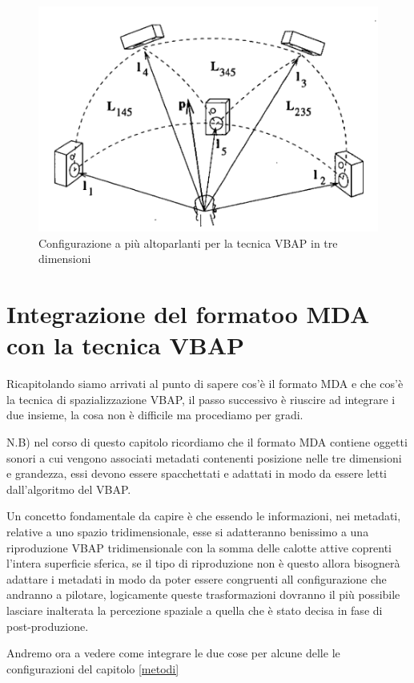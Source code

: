 \documentclass[12pt,a4paper]{report}
\begin{document}
\begin{itemize}
\begin{figure}[htbp]
	\centering
	\includegraphics[scale=0.50 ]{figures/matrix3dfull.png}
	\caption {Configurazione a più altoparlanti per la tecnica VBAP in tre dimensioni}
	\label{fig:matrix3dfull}
	\end{figure}


\section{Integrazione del formatoo MDA con la tecnica VBAP}

Ricapitolando siamo arrivati al punto di sapere cos'è il formato MDA e che cos'è la tecnica di spazializzazione VBAP,
il passo successivo è riuscire ad integrare i due insieme, la cosa non è difficile ma procediamo per gradi.

N.B) nel corso di questo capitolo
ricordiamo che il formato MDA contiene oggetti sonori a cui vengono associati metadati contenenti posizione nelle tre dimensioni e grandezza, essi devono essere spacchettati e adattati in modo da essere letti dall'algoritmo del VBAP.

Un concetto fondamentale da capire è che essendo le informazioni, nei metadati, relative a uno spazio tridimensionale, esse si adatteranno benissimo a una riproduzione VBAP tridimensionale con la somma delle calotte attive coprenti l'intera superficie sferica, se il tipo di riproduzione non è questo allora bisognerà adattare i metadati in modo da poter essere congruenti all configurazione che andranno a pilotare, logicamente queste trasformazioni dovranno il più possibile lasciare inalterata la percezione spaziale a quella che è stato decisa in fase di post-produzione.

Andremo ora a vedere come integrare le due cose per alcune delle le configurazioni del capitolo \ref{metodi}


\end{itemize}
\end{document}
